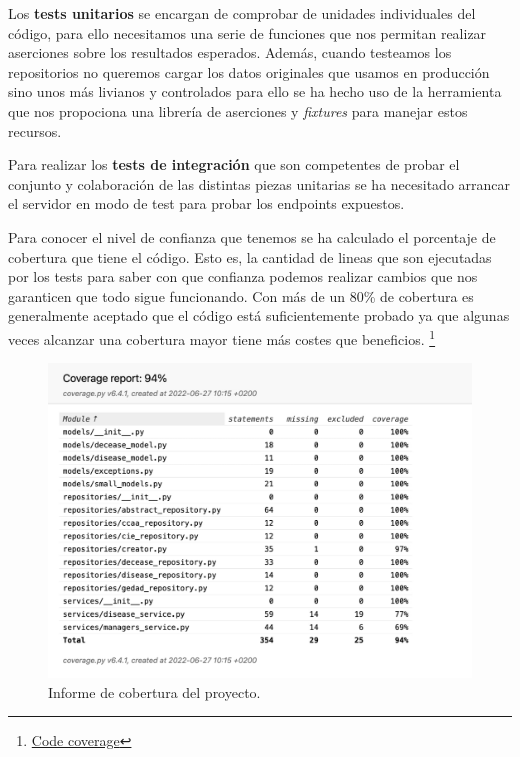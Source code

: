 Los \textbf{tests unitarios} se encargan de comprobar de unidades individuales del código, para ello necesitamos una serie de funciones que nos permitan realizar aserciones sobre los resultados esperados. Además, cuando testeamos los repositorios no queremos cargar los datos originales que usamos en producción sino unos más livianos y controlados para ello se ha hecho uso de la herramienta  que nos propociona una librería de aserciones y \textit{fixtures} para manejar estos recursos.

Para realizar los \textbf{tests de integración} que son competentes de probar el conjunto y colaboración de las distintas piezas unitarias se ha necesitado arrancar el servidor en modo de test para probar los endpoints expuestos. 

Para conocer el nivel de confianza que tenemos se ha calculado el porcentaje de cobertura que tiene el código. Esto es, la cantidad de lineas que son ejecutadas por los tests para saber con que confianza podemos realizar cambios que nos garanticen que todo sigue funcionando. Con más de un 80\% de cobertura es generalmente aceptado que el código está suficientemente probado ya que algunas veces alcanzar una cobertura mayor tiene más costes que beneficios. \footnote{\href{https://www.atlassian.com/continuous-delivery/software-testing/code-coverage}{Code coverage}}

\FloatBarrier
\begin{figure}[h]
	\centering	
	\includegraphics[width=\textwidth]{doc/logos/imgs/cobertura.jpg}
    \caption{ Informe de cobertura del proyecto.}
    \label{fig:cobertura-tests}
\end{figure}
\FloatBarrier


